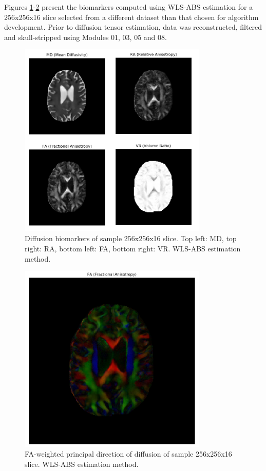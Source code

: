 Figures \ref{fig:m6_pic_6}-\ref{fig:m6_pic_7} present the biomarkers computed using WLS-ABS estimation for a 256x256x16 slice selected from a different dataset than that chosen for algorithm development. Prior to diffusion tensor estimation, data was reconstructed, filtered and skull-stripped using Modules 01, 03, 05 and 08.

\begin{figure}[H]
	\includegraphics[width=9cm]{figures/Module_06/final_wls_biomarkers}
	\centering
	\caption{Diffusion biomarkers of sample 256x256x16 slice. Top left: MD, top right: RA, bottom left: FA, bottom right: VR. WLS-ABS estimation method.}
	\label{fig:m6_pic_6}
\end{figure}
\begin{figure}[H]
	\includegraphics[width=9cm]{figures/Module_06/final_wls_rgb}
	\centering
	\caption{FA-weighted principal direction of diffusion of sample 256x256x16 slice. \vbox{WLS-ABS estimation method.}}
	\label{fig:m6_pic_7}
\end{figure}